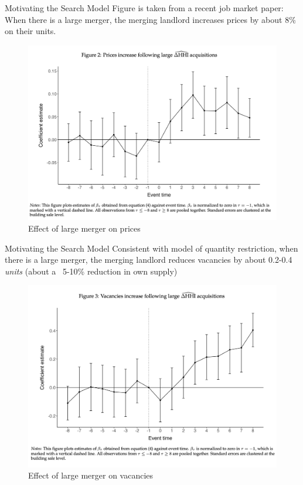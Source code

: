 \documentclass[10pt, xcolor=dvipsnames]{beamer}
\begin{document}
\begin{frame}{Motivating the Search Model}
Figure is taken from a recent job market paper: When there is a large merger, the merging landlord increases prices by about 8\% on their units.
    \begin{figure}
        \centering
        \includegraphics[width=0.5\linewidth]{figs/fern-jmp-prices.png}
        \caption{Effect of large merger on prices}
        \label{fig:fern-prices}
    \end{figure}
\end{frame}

\begin{frame}{Motivating the Search Model}
Consistent with model of quantity restriction, when there is a large merger, the merging landlord reduces vacancies by about 0.2-0.4 \textit{units} (about a ~5-10\% reduction in own supply)
    \begin{figure}
        \centering
        \includegraphics[width=0.5\linewidth]{figs/fern-jmp-vacancy.png}
        \caption{Effect of large merger on vacancies}
        \label{fig:fern-vacancies}
    \end{figure}
\end{frame}


    
\end{document}
